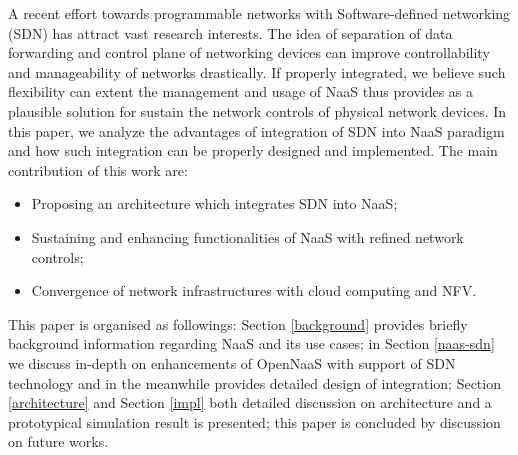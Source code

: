 A recent effort towards programmable networks with Software-defined networking
(SDN) has attract vast research interests. The idea of separation of data
forwarding and control plane of networking devices can improve controllability
and manageability of networks drastically. If properly integrated, we believe
such flexibility can extent the management and usage of NaaS thus provides as a
plausible solution for sustain the network controls of physical network
devices.  In this paper, we analyze the advantages of integration of SDN into
NaaS paradigm and how such integration can be properly designed and
implemented. The main contribution of this work are:

\begin{itemize}
	\item Proposing an architecture which integrates SDN into NaaS;
	\item Sustaining and enhancing functionalities of NaaS with refined network controls;
	\item Convergence of network infrastructures with cloud computing and NFV.
\end{itemize}

This paper is organised as followings: Section \ref{background}
provides briefly background information regarding NaaS and its use cases;
in Section \ref{naas-sdn} we discuss in-depth on enhancements of OpenNaaS with
support of SDN technology and in the meanwhile provides detailed design of
integration; Section \ref{architecture} and  Section \ref{impl} both detailed
discussion on architecture and a prototypical simulation result is presented;
this paper is concluded by discussion on future works. 
